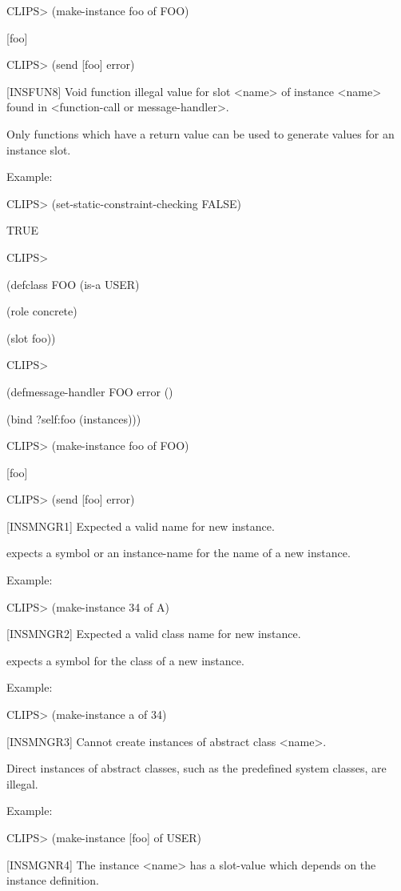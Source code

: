 \documentclass[letterpaper,10pt,english]{sphinxmanual}
\begin{document}
CLIPS\textgreater{} (make-instance foo of FOO)

{[}foo{]}

CLIPS\textgreater{} (send {[}foo{]} error)

{[}INSFUN8{]} Void function illegal value for slot \textless{}name\textgreater{} of instance \textless{}name\textgreater{}
found in \textless{}function-call or message-handler\textgreater{}.

Only functions which have a return value can be used to generate values
for an instance slot.

Example:

CLIPS\textgreater{} (set-static-constraint-checking FALSE)

TRUE

CLIPS\textgreater{}

(defclass FOO (is-a USER)

(role concrete)

(slot foo))

CLIPS\textgreater{}

(defmessage-handler FOO error ()

(bind ?self:foo (instances)))

CLIPS\textgreater{} (make-instance foo of FOO)

{[}foo{]}

CLIPS\textgreater{} (send {[}foo{]} error)

{[}INSMNGR1{]} Expected a valid name for new instance.

 expects a symbol or an instance-name for the name of a
new instance.

Example:

CLIPS\textgreater{} (make-instance 34 of A)

{[}INSMNGR2{]} Expected a valid class name for new instance.

 expects a symbol for the class of a new instance.

Example:

CLIPS\textgreater{} (make-instance a of 34)

{[}INSMNGR3{]} Cannot create instances of abstract class \textless{}name\textgreater{}.

Direct instances of abstract classes, such as the predefined system
classes, are illegal.

Example:

CLIPS\textgreater{} (make-instance {[}foo{]} of USER)

{[}INSMGNR4{]} The instance \textless{}name\textgreater{} has a slot-value which depends on the
instance definition.
\end{document}
